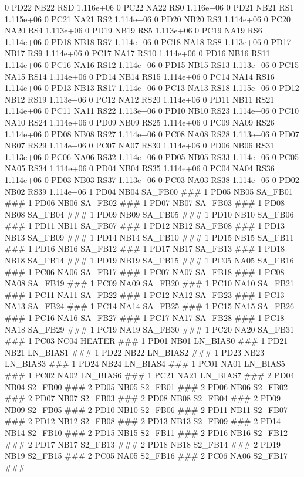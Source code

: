 0 PD22 NB22 RSD 1.116e+06 
0 PC22 NA22 RS0 1.116e+06 
0 PD21 NB21 RS1 1.115e+06 
0 PC21 NA21 RS2 1.114e+06 
0 PD20 NB20 RS3 1.114e+06 
0 PC20 NA20 RS4 1.113e+06 
0 PD19 NB19 RS5 1.113e+06 
0 PC19 NA19 RS6 1.114e+06 
0 PD18 NB18 RS7 1.114e+06 
0 PC18 NA18 RS8 1.113e+06 
0 PD17 NB17 RS9 1.114e+06 
0 PC17 NA17 RS10 1.114e+06 
0 PD16 NB16 RS11 1.114e+06 
0 PC16 NA16 RS12 1.114e+06 
0 PD15 NB15 RS13 1.113e+06 
0 PC15 NA15 RS14 1.114e+06 
0 PD14 NB14 RS15 1.114e+06 
0 PC14 NA14 RS16 1.114e+06 
0 PD13 NB13 RS17 1.114e+06 
0 PC13 NA13 RS18 1.115e+06 
0 PD12 NB12 RS19 1.113e+06 
0 PC12 NA12 RS20 1.114e+06 
0 PD11 NB11 RS21 1.114e+06 
0 PC11 NA11 RS22 1.113e+06 
0 PD10 NB10 RS23 1.114e+06 
0 PC10 NA10 RS24 1.114e+06 
0 PD09 NB09 RS25 1.114e+06 
0 PC09 NA09 RS26 1.114e+06 
0 PD08 NB08 RS27 1.114e+06 
0 PC08 NA08 RS28 1.113e+06 
0 PD07 NB07 RS29 1.114e+06 
0 PC07 NA07 RS30 1.114e+06 
0 PD06 NB06 RS31 1.113e+06 
0 PC06 NA06 RS32 1.114e+06 
0 PD05 NB05 RS33 1.114e+06 
0 PC05 NA05 RS34 1.114e+06 
0 PD04 NB04 RS35 1.114e+06 
0 PC04 NA04 RS36 1.114e+06 
0 PD03 NB03 RS37 1.113e+06 
0 PC03 NA03 RS38 1.114e+06 
0 PD02 NB02 RS39 1.114e+06 
1 PD04 NB04 SA_FB00 ### 
1 PD05 NB05 SA_FB01 ### 
1 PD06 NB06 SA_FB02 ### 
1 PD07 NB07 SA_FB03 ### 
1 PD08 NB08 SA_FB04 ### 
1 PD09 NB09 SA_FB05 ### 
1 PD10 NB10 SA_FB06 ### 
1 PD11 NB11 SA_FB07 ### 
1 PD12 NB12 SA_FB08 ### 
1 PD13 NB13 SA_FB09 ### 
1 PD14 NB14 SA_FB10 ### 
1 PD15 NB15 SA_FB11 ### 
1 PD16 NB16 SA_FB12 ### 
1 PD17 NB17 SA_FB13 ### 
1 PD18 NB18 SA_FB14 ### 
1 PD19 NB19 SA_FB15 ### 
1 PC05 NA05 SA_FB16 ### 
1 PC06 NA06 SA_FB17 ### 
1 PC07 NA07 SA_FB18 ### 
1 PC08 NA08 SA_FB19 ### 
1 PC09 NA09 SA_FB20 ### 
1 PC10 NA10 SA_FB21 ### 
1 PC11 NA11 SA_FB22 ### 
1 PC12 NA12 SA_FB23 ### 
1 PC13 NA13 SA_FB24 ### 
1 PC14 NA14 SA_FB25 ### 
1 PC15 NA15 SA_FB26 ### 
1 PC16 NA16 SA_FB27 ### 
1 PC17 NA17 SA_FB28 ### 
1 PC18 NA18 SA_FB29 ### 
1 PC19 NA19 SA_FB30 ### 
1 PC20 NA20 SA_FB31 ### 
1 PC03 NC04 HEATER ### 
1 PD01 NB01 LN_BIAS0 ### 
1 PD21 NB21 LN_BIAS1 ### 
1 PD22 NB22 LN_BIAS2 ### 
1 PD23 NB23 LN_BIAS3 ### 
1 PD24 NB24 LN_BIAS4 ### 
1 PC01 NA01 LN_BIAS5 ### 
1 PC02 NA02 LN_BIAS6 ### 
1 PC21 NA21 LN_BIAS7 ### 
2 PD04 NB04 S2_FB00 ### 
2 PD05 NB05 S2_FB01 ### 
2 PD06 NB06 S2_FB02 ### 
2 PD07 NB07 S2_FB03 ### 
2 PD08 NB08 S2_FB04 ### 
2 PD09 NB09 S2_FB05 ### 
2 PD10 NB10 S2_FB06 ### 
2 PD11 NB11 S2_FB07 ### 
2 PD12 NB12 S2_FB08 ### 
2 PD13 NB13 S2_FB09 ### 
2 PD14 NB14 S2_FB10 ### 
2 PD15 NB15 S2_FB11 ### 
2 PD16 NB16 S2_FB12 ### 
2 PD17 NB17 S2_FB13 ### 
2 PD18 NB18 S2_FB14 ### 
2 PD19 NB19 S2_FB15 ### 
2 PC05 NA05 S2_FB16 ### 
2 PC06 NA06 S2_FB17 ### 
